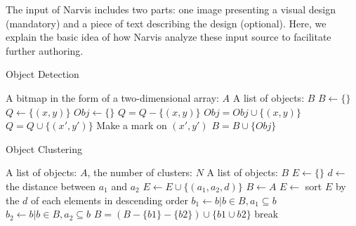 The input of Narvis includes two parts: one image presenting a visual design (mandatory) and a piece of text describing the design (optional). Here, we explain the basic idea of how Narvis analyze these input source to facilitate further authoring. 
\begin{algorithm} 
        \caption{Object Detection}  
        \label{alg:alg1}
        \begin{algorithmic} %
            \Require A bitmap in the form of a two-dimensional array: $A$
            \Ensure A list of objects: $B$
            \State $B \gets \{\}$
                    \State $Q \gets \{(x,y)\} $
                    \State $Obj \gets \{\}$
                        \State $Q = Q - \{(x,y)\}$
                        \State $Obj = Obj \cup \{(x,y)\}$
                                \State $Q = Q \cup \{(x',y')\}$
                                \State Make a mark on $(x',y')$
                            \EndIf
                        \EndFor
                    \EndFor
                    \State $B = B \cup \{Obj\}$
                \EndIf
            \EndFor
            \State {}
        \end{algorithmic}  
    \end{algorithm} 
    
    
    \begin{algorithm}  
        \caption{Object Clustering} 
        \label{alg:alg2} 
        \begin{algorithmic} %
            \Require A list of objects: $A$, the number of clusters: $N$
            \Ensure A list of objects: $B$
            \State $E \gets \{\}$
                 
                        \State $d \gets$ the distance between $a_1$ and $a_2$
                        \State $E \gets E \cup \{(a_1, a_2, d)\}$
                    \EndIf
                \EndFor
            \EndFor
            \State $B \gets A$
            \State $E \gets$ sort $E$ by the $d$ of each elements in descending order
                \State $b_1 \gets b|b\in B, a_1 \subseteq b$
                \State $b_2 \gets b|b\in B, a_2 \subseteq b$
                    \State $B = (B - \{b1\} - \{b2\})\cup \{b1 \cup b2\}$
                \EndIf
                    \State break
                \EndIf
            \EndFor
            \State {}
        \end{algorithmic}  
    \end{algorithm} 
    
